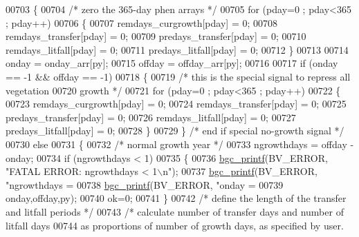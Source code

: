\begin{DoxyCode}
{{{00703         \{
00704             \textcolor{comment}{/* zero the 365-day phen arrays */}
00705             \textcolor{keywordflow}{for} (pday=0 ; pday<365 ; pday++)
00706             \{
00707                 remdays\_curgrowth[pday] = 0;
00708                 remdays\_transfer[pday] = 0;
00709                 predays\_transfer[pday] = 0;
00710                 remdays\_litfall[pday] = 0;
00711                 predays\_litfall[pday] = 0;
00712             \}
00713             
00714             onday = onday\_arr[py];
00715             offday = offday\_arr[py];
00716             
00717             \textcolor{keywordflow}{if} (onday == -1 && offday == -1)
00718             \{
00719                 \textcolor{comment}{/* this is the special signal to repress all vegetation}
00720 \textcolor{comment}{                growth */}
00721                 \textcolor{keywordflow}{for} (pday=0 ; pday<365 ; pday++)
00722                 \{
00723                     remdays\_curgrowth[pday] = 0;
00724                     remdays\_transfer[pday] = 0;
00725                     predays\_transfer[pday] = 0;
00726                     remdays\_litfall[pday] = 0;
00727                     predays\_litfall[pday] = 0;
00728                 \}
00729             \} \textcolor{comment}{/* end if special no-growth signal */}
00730             \textcolor{keywordflow}{else}
00731             \{
00732                 \textcolor{comment}{/* normal growth year */}
00733                 ngrowthdays = offday - onday;
00734                 \textcolor{keywordflow}{if} (ngrowthdays < 1)
00735                 \{
00736                     \hyperlink{bgc__io_8c_af287cce6e2aede1ce337de9319e80d0d}{bgc\_printf}(BV\_ERROR, \textcolor{stringliteral}{"FATAL ERROR: ngrowthdays < 1\(\backslash\)n"});
00737                     \hyperlink{bgc__io_8c_af287cce6e2aede1ce337de9319e80d0d}{bgc\_printf}(BV\_ERROR, \textcolor{stringliteral}{"ngrowthdays = %
00738                     \hyperlink{bgc__io_8c_af287cce6e2aede1ce337de9319e80d0d}{bgc\_printf}(BV\_ERROR, \textcolor{stringliteral}{"onday = %
00739                     onday,offday,py);
00740                     ok=0;
00741                 \}
00742                 \textcolor{comment}{/* define the length of the transfer and litfall periods */}
00743                 \textcolor{comment}{/* calculate number of transfer days and number of litfall days}
00744 \textcolor{comment}{                as proportions of number of growth days, as specified by user.}
}}}}}
\end{DoxyCode}
